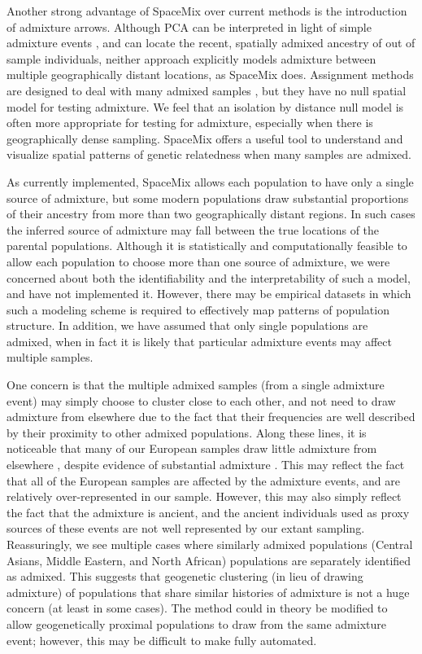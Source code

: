\documentclass[12pt]{article}
\begin{document}
Another strong advantage of SpaceMix over current methods is the introduction of admixture arrows. 
Although PCA can be interpreted in light of simple admixture events \citep{mcvean_genealogical_2009}, 
and \citet{yang_model-based_2012,yang_spatial_2014} can locate the recent, spatially admixed ancestry of out of sample individuals,
neither approach explicitly models admixture between multiple geographically distant locations,
as SpaceMix does.
Assignment methods are designed to deal with many admixed samples \citep{STRUCTURE}, 
but they have no null spatial model for testing admixture.
We feel that an isolation by distance null model is often more appropriate for testing for admixture, 
especially when there is geographically dense sampling. 
SpaceMix offers a useful tool to understand and visualize spatial patterns of genetic relatedness when many samples are admixed. 

As currently implemented, SpaceMix allows each population to have only a single source of admixture, 
but some modern populations draw substantial proportions of their ancestry from more than two geographically distant regions.
In such cases the inferred source of admixture may fall between the true locations of the parental populations.  
Although it is statistically and computationally feasible to allow each population to choose more than one source of admixture, 
we were concerned about both the identifiability and the interpretability of such a model, and have not implemented it.
However, there may be empirical datasets in which such a modeling scheme is required to effectively map patterns of population structure.
In addition, we have assumed that only single populations are admixed, when in fact it is likely that particular admixture events may affect multiple samples.

One concern is that the multiple admixed samples (from a single admixture event) may simply choose to cluster close to each other, 
and not need to draw admixture from elsewhere due to the fact that their frequencies are well described by their proximity to other admixed populations.  
Along these lines, it is noticeable that many of our European samples draw little admixture from elsewhere \citep[also noted by][ using a different approach]{Hellenthal}, 
despite evidence of substantial admixture \citep{lazaridis_ancient_2014}.
This may reflect the fact that all of the European samples are affected by the admixture events, and are relatively over-represented in our sample. 
However, this may also simply reflect the fact that the admixture is ancient, 
and the ancient individuals used as proxy sources of these events are not well represented by our extant sampling. 
Reassuringly, we see multiple cases where similarly admixed populations (Central Asians, Middle Eastern, and North African) 
populations are separately identified as admixed. 
This suggests that geogenetic clustering (in lieu of drawing admixture) of populations that share similar histories of admixture is not a huge concern 
(at least in some cases). 
The method could in theory be modified to allow geogenetically proximal populations to draw from the same admixture event;
however, this may be difficult to make fully automated.
\end{document}
